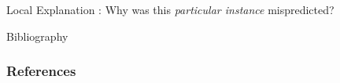 \documentclass[11pt,dvipsnames,usenames,aspectratio=169]{beamer}  %
\begin{document}
\begin{frame}{Local Explanation}
  : Why was this \textit{particular instance} mispredicted?

  \vspace{16pt}
  \begin{center}
  \end{center}
\end{frame}

\begin{frame}[allowframebreaks]{Bibliography}{}
  {\tiny
    \frametitle{References}
    
    
  }
\end{frame}
\end{document}
